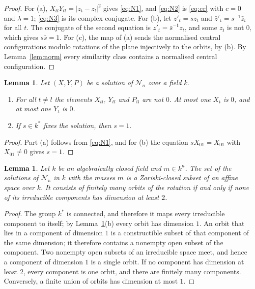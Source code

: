 \documentclass[11pt]{amsart}
\newtheorem{lemma}[theorem]{Lemma}
\theoremstyle{definition}
\theoremstyle{remark}
\numberwithin{equation}{section}
\newcommand{\cN}{\mathcal{N}}
\begin{document}
\begin{proof}
For (a), $X_{tl} Y_{tl} = |z_t - z_l|^2$ gives \eqref{eq:N1}, and \eqref{eq:N2} is \eqref{eq:cc} with
$c = 0$ and $\lambda = 1$; \eqref{eq:N3} is its complex conjugate. For (b), let $z'_t = s z_t$ and
$\bar z'_t = s^{-1} \bar z_t$ for all $t$. The conjugate of the second equation is
$z'_t = \bar s^{-1} z_t$, and some $z_t$ is not $0$, which gives $s \bar s = 1$. For (c), the map of (a)
sends the normalised central configurations modulo rotations of the plane injectively to the orbits, by
(b). By Lemma~\ref{lem:norm} every similarity class contains a normalised central configuration.
\end{proof}

\begin{lemma}\label{lem:facts}
Let $(X, Y, P)$ be a solution of $\cN_n$ over a field $k$.
\begin{enumerate}
\item[(a)] For all $t \ne l$ the elements $X_{tl}$, $Y_{tl}$ and $P_{tl}$ are not $0$. At most one $X_t$
is $0$, and at most one $Y_t$ is $0$.
\item[(b)] If $s \in k^{*}$ fixes the solution, then $s = 1$.
\end{enumerate}
\end{lemma}

\begin{proof}
Part (a) follows from \eqref{eq:N1}, and for (b) the equation $s X_{01} = X_{01}$ with $X_{01} \ne 0$
gives $s = 1$.
\end{proof}

\begin{lemma}\label{lem:orbits}
Let $k$ be an algebraically closed field and $m \in k^n$. The set of the solutions of $\cN_n$ in $k$ with
the masses $m$ is a Zariski-closed subset of an affine space over $k$. It consists of finitely many orbits
of the rotation if and only if none of its irreducible components has dimension at least $2$.
\end{lemma}

\begin{proof}
The group $k^{*}$ is connected, and therefore it maps every irreducible component to itself; by
Lemma~\ref{lem:facts}(b) every orbit has dimension $1$. An orbit that lies in a component of dimension
$1$ is a constructible subset of that component of the same dimension; it therefore contains a nonempty
open subset of the component. Two nonempty open subsets of an irreducible space meet, and hence a
component of dimension $1$ is a single orbit. If no component has dimension at least $2$, every
component is one orbit, and there are finitely many components. Conversely, a finite union of orbits has
dimension at most $1$.
\end{proof}
\end{document}
